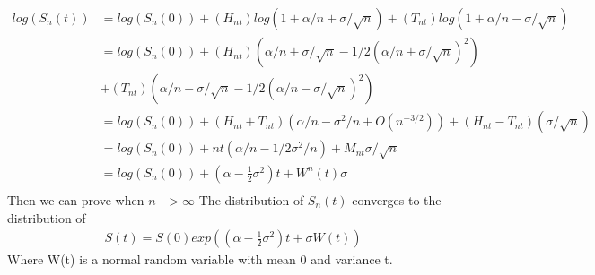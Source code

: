 \documentclass[a4paper]{article}
\begin{document}
 \begin{align*}
	log(S_n(t)) & = log(S_n(0)) + (H_{nt}) log(1+\alpha /n + \sigma /\sqrt{n})
								+ (T_{nt}) log(1+\alpha /n - \sigma /\sqrt{n})\\
				& = log(S_n(0)) + (H_{nt}) (\alpha /n + \sigma /\sqrt{n} - 1/2(\alpha /n + \sigma /\sqrt{n})^2)\\
				& +(T_{nt}) (\alpha /n - \sigma /\sqrt{n} - 1/2(\alpha /n - \sigma /\sqrt{n})^2)\\
				& = log(S_n(0)) +(H_{nt} + T_{nt}) (\alpha/n - \sigma^2 /n + O(n^{-3/2}))
				+ (H_{nt} - T_{nt}) (\sigma /\sqrt{n} )\\
				& = log(S_n(0)) + nt(\alpha /n - 1/2 \sigma^2 /n) + M_{nt} \sigma/\sqrt{n}\\
				& = log(S_n(0)) + (\alpha - \frac{1}{2} \sigma^2)t + W^{n}(t) \sigma \\
\end{align*}
  Then we can prove when $n-> \infty$
  The distribution of $S_n(t)$ converges to the distribution of
  \begin{align*}
	  S(t) = S(0) exp((\alpha - \frac{1}{2} \sigma^2 )t +\sigma W(t))
  \end{align*}
  Where W(t) is a normal random variable with mean 0 and variance t. 
\end{document}
